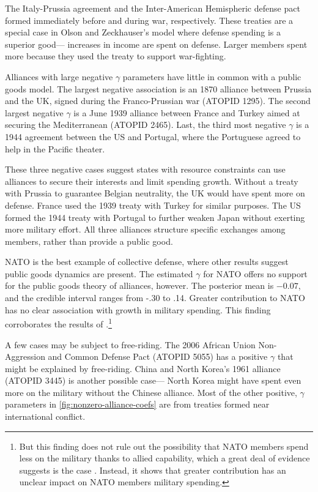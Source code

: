 \documentclass[12pt]{article}
\begin{document}
The Italy-Prussia agreement and the Inter-American Hemispheric defense pact formed immediately before and during war, respectively. 
These treaties are a special case in Olson and Zeckhauser's model where defense spending is a superior good--- increases in income are spent on defense. 
Larger members spent more because they used the treaty to support war-fighting. 


Alliances with large negative $\gamma$ parameters have little in common with a public goods model. 
The largest negative association is an 1870 alliance between Prussia and the UK, signed during the Franco-Prussian war (ATOPID 1295). 
The second largest negative $\gamma$ is a June 1939 alliance between France and Turkey aimed at securing the Mediterranean (ATOPID 2465).
Last, the third most negative $\gamma$ is a 1944 agreement between the US and Portugal, where the Portuguese agreed to help in the Pacific theater. 


These three negative cases suggest states with resource constraints can use alliances to secure their interests and limit spending growth. 
Without a treaty with Prussia to guarantee Belgian neutrality, the UK would have spent more on defense.
France used the 1939 treaty with Turkey for similar purposes. 
The US formed the 1944 treaty with Portugal to further weaken Japan without exerting more military effort. 
All three alliances structure specific exchanges among members, rather than provide a public good. 


NATO is the best example of collective defense, where other results suggest public goods dynamics are present. 
The estimated $\gamma$ for NATO offers no support for the public goods theory of alliances, however. 
The posterior mean is $-0.07$, and the credible interval ranges from -.30 to .14.  
Greater contribution to NATO has no clear association with growth in military spending. 
This finding corroborates the results of \citet{PluemperNeumayer2015}.\footnote{
But this finding does not rule out the possibility that NATO members spend less on the military thanks to allied capability, which a great deal of evidence suggests is the case \citep{GeorgeSandler2017}.
Instead, it shows that greater contribution has an unclear impact on NATO members military spending.}


A few cases may be subject to free-riding. 
The 2006 African Union Non-Aggression and Common Defense Pact (ATOPID 5055) has a positive $\gamma$ that might be explained by free-riding.  
China and North Korea's 1961 alliance (ATOPID 3445) is another possible case--- North Korea might have spent even more on the military without the Chinese alliance. 
Most of the other positive, $\gamma$ parameters in \autoref{fig:nonzero-alliance-coefs} are from treaties formed near international conflict. 
\end{document}
